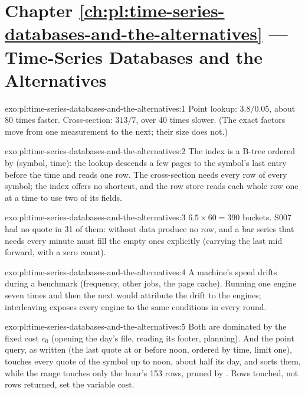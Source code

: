\section*{Chapter \ref{ch:pl:time-series-databases-and-the-alternatives} --- Time-Series Databases and the Alternatives}

\begin{solution}{exo:pl:time-series-databases-and-the-alternatives:1}
Point lookup: $3.8 / 0.05$, about 80 times faster. Cross-section: $313 / 7$, over 40 times slower. (The exact factors move from one
measurement to the next; their size does not.)
\end{solution}

\begin{solution}{exo:pl:time-series-databases-and-the-alternatives:2}
The index is a B-tree ordered by (symbol, time): the lookup descends a few pages to the symbol's last entry before the time and
reads one row. The cross-section needs every row of every symbol; the index offers no shortcut, and the row store reads each whole
row one at a time to use two of its fields.
\end{solution}

\begin{solution}{exo:pl:time-series-databases-and-the-alternatives:3}
$6.5 \times 60 = 390$ buckets. S007 had no quote in 31 of them:  without data produce no row, and a bar series that
needs every minute must fill the empty ones explicitly (carrying the last mid forward, with a zero count).
\end{solution}

\begin{solution}{exo:pl:time-series-databases-and-the-alternatives:4}
A machine's speed drifts during a benchmark (frequency, other jobs, the page cache). Running one engine seven times and then the
next would attribute the drift to the engines; interleaving exposes every engine to the same conditions in every round.
\end{solution}

\begin{solution}{exo:pl:time-series-databases-and-the-alternatives:5}
Both are dominated by the fixed cost $c_0$ (opening the day's file, reading its footer, planning). And the point query, as written
(the last quote at or before noon, ordered by time, limit one), touches every quote of the symbol up to noon, about half its day,
and sorts them, while the range touches only the hour's 153 rows, pruned by . Rows touched, not rows returned, set the
variable cost.
\end{solution}

